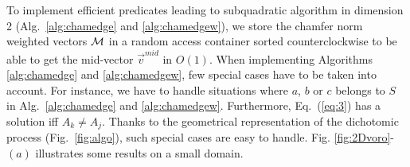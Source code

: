 \documentclass{llncs}
\begin{document}
To implement efficient predicates leading to subquadratic algorithm in
dimension 2 (Alg.~\ref{alg:chamedge} and \ref{alg:chamedgew}), we
store the chamfer norm weighted vectors $\mathcal{M}$ in a random access
container sorted counterclockwise to be able to get the mid-vector
$\vec{v}^{mid}$ in $O(1)$. When implementing Algorithms
\ref{alg:chamedge} and \ref{alg:chamedgew}, few special cases have to
be taken into account. For instance, we have to handle situations
where $a$, $b$ or $c$ belongs to $S$ in Alg.~\ref{alg:chamedge} and
\ref{alg:chamedgew}. Furthermore, Eq.~(\ref{eq:3}) has a solution iff
$A_k\neq A_j$. Thanks to the geometrical representation of the
dichotomic process (Fig.~\ref{fig:algo}), such special cases are easy to
handle. Fig. \ref{fig:2Dvoro}-$(a)$ illustrates some results on a small
domain.
\begin{figure}[htbp]
  \begin{center}
\end{center}
\end{figure}
\end{document}
